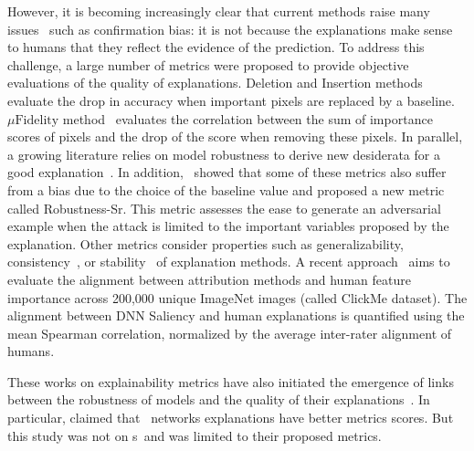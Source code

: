 However, it is becoming increasingly clear that current methods raise many issues~\cite{Adebayo18Sanity, Heo19foolingInterpretation, sixt2020explanations} such as confirmation bias: it is not because the explanations make sense to humans that they reflect the evidence of the prediction. 
To address this challenge, a large number of metrics were proposed to provide objective evaluations of the quality of explanations. Deletion and Insertion methods~\cite{petsiuk18Rise} evaluate the drop in accuracy when important pixels are replaced by a baseline. $\mu\text{Fidelity}$ method~\cite{Bhatt20muFidelity} evaluates the correlation between the sum of importance scores of pixels and the drop of the score when removing these pixels.
In parallel, a growing literature relies on model robustness to derive new desiderata for a good explanation~\cite{hsieh2020evaluations, boopathy2020proper, lin2019explanations, ross2021learning, eva}. 
In addition,~\cite{hsieh2020evaluations} showed that some of these metrics also suffer from a bias due to the choice of the baseline value and proposed a new metric called Robustness-Sr. This metric assesses the ease to generate an adversarial example when the attack is limited to the important variables proposed by the explanation.
Other metrics 
consider properties such as generalizability, consistency~\cite{felHowGood22}, or stability~\cite{Yeh19InfidelityExplain,Bhatt20muFidelity} of explanation methods.
A recent approach~\cite{linsley2017visual} aims to evaluate the alignment between attribution methods and human feature importance across 200,000 unique ImageNet images (called ClickMe dataset). The alignment between DNN Saliency and human explanations is quantified using the mean Spearman correlation, normalized by the average inter-rater alignment of humans.


These works on explainability metrics have also initiated the emergence of links between the robustness of models and the quality of their explanations~\cite{Chalasani20explanationAdvTraining,wang2022robust,Harshay2021,Suraj2022,Dombrowski2022,Etmann2019OnTC}. In particular,\cite{felHowGood22} claimed that \onlyonelip~networks explanations have better metrics scores. But this study was not on \otnn s~and was limited to their proposed metrics.

